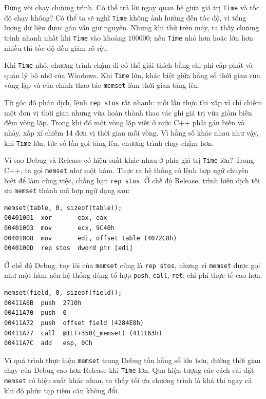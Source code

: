 \documentclass[11pt]{article}
\begin{document}
Đừng vội chạy chương trình. Có thể trả lời ngay quan hệ giữa giá trị
\texttt{Time} và tốc độ chạy không? Có thể ta sẽ nghĩ \texttt{Time} không ảnh
hưởng đến tốc độ, vì tổng lượng dữ liệu được gán vẫn giữ nguyên. Nhưng khi thử
trên máy, ta thấy chương trình nhanh nhất khi \texttt{Time} vào khoảng
\(100000\); nếu \texttt{Time} nhỏ hơn hoặc lớn hơn nhiều thì tốc độ đều giảm
rõ rệt.

Khi \texttt{Time} nhỏ, chương trình chậm đi có thể giải thích bằng chi phí cấp
phát và quản lý bộ nhớ của Windows. Khi \texttt{Time} lớn, khác biệt giữa hằng
số thời gian của vòng lặp và của chính thao tác \texttt{memset} làm thời gian
tăng lên.

Từ góc độ phản dịch, lệnh \texttt{rep stos} rất nhanh: mỗi lần thực thi xấp xỉ
chỉ chiếm một đơn vị thời gian nhưng vừa hoàn thành thao tác ghi giá trị vừa
giảm biến đếm vòng lặp. Trong khi đó một vòng lặp viết ở mức C++ phải gán biến
và nhảy, xấp xỉ chiếm 14 đơn vị thời gian mỗi vòng. Vì hằng số khác nhau như
vậy, khi \texttt{Time} lớn, tức số lần gọi tăng lên, chương trình chạy chậm
hơn.

Vì sao Debug và Release có hiệu suất khác nhau ở phía giá trị
\texttt{Time} lớn? Trong C++, ta gọi \texttt{memset} như một hàm. Thực ra hệ
thống có lệnh hợp ngữ chuyên biệt để làm cùng việc, chẳng hạn \texttt{rep
stos}. Ở chế độ Release, trình biên dịch tối ưu \texttt{memset} thành mã hợp
ngữ dạng sau:
\begin{verbatim}
memset(table, 0, sizeof(table));
00401001  xor       eax, eax
00401003  mov       ecx, 9C40h
00401008  mov       edi, offset table (4072C8h)
0040100D  rep stos  dword ptr [edi]
\end{verbatim}

Ở chế độ Debug, tuy lõi của \texttt{memset} cũng là \texttt{rep stos}, nhưng
vì \texttt{memset} được gọi như một hàm nên hệ thống dùng tổ hợp
\texttt{push}, \texttt{call}, \texttt{ret}; chi phí thực tế cao hơn:
\begin{verbatim}
memset(field, 0, sizeof(field));
00411A6B  push  2710h
00411A70  push  0
00411A72  push  offset field (4284E8h)
00411A77  call  @ILT+350(_memset) (411163h)
00411A7C  add   esp, 0Ch
\end{verbatim}

Vì quá trình thực hiện \texttt{memset} trong Debug tốn hằng số lớn hơn, đường
thời gian chạy của Debug cao hơn Release khi \texttt{Time} lớn. Qua hiện tượng
các cách cài đặt \texttt{memset} có hiệu suất khác nhau, ta thấy tối ưu chương
trình là khả thi ngay cả khi độ phức tạp tiệm cận không đổi.
\end{document}
